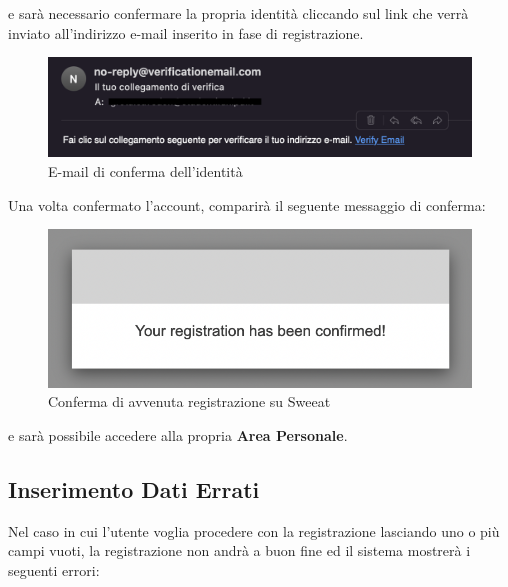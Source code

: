 e sarà necessario confermare la propria identità cliccando sul link che verrà inviato all’indirizzo e-mail inserito in fase di registrazione.

\begin{figure}[H]
\centering
\includegraphics[scale=0.5]{./images/Registrazione/emailReg.png} 
\caption{E-mail di conferma dell'identità}
\end{figure}

Una volta confermato l’account, comparirà il seguente messaggio di conferma:

\begin{figure}[H]
\centering
\includegraphics[scale=0.5]{./images/Registrazione/Conferma.png} 
\caption{Conferma di avvenuta registrazione su Sweeat}
\end{figure}

e sarà possibile accedere alla propria \textbf{Area Personale}.

\subsection{Inserimento Dati Errati}

Nel caso in cui l'utente voglia procedere con la registrazione lasciando uno o più campi vuoti, la registrazione non andrà a buon fine ed il sistema mostrerà i seguenti errori:

